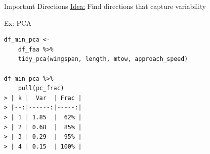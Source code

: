 \documentclass[14pt]{beamer}
\begin{document}
\begin{frame}{Important Directions}
  \huge\underline{Idea:} Find directions that capture variability
\end{frame}


\begin{frame}[fragile]{Ex: PCA}
  \begin{lstlisting}
df_min_pca <-
    df_faa %>%
    tidy_pca(wingspan, length, mtow, approach_speed)

df_min_pca %>%
    pull(pc_frac)
> | k |  Var  | Frac |
> |--:|------:|-----:|
> | 1 | 1.85  |  62% |
> | 2 | 0.68  |  85% |
> | 3 | 0.29  |  95% |
> | 4 | 0.15  | 100% |
  \end{lstlisting}
\end{frame}

\end{document}
